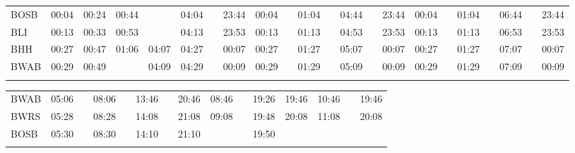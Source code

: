\begin{center}
\begin{tabular}
\begin{tabular}
\begin{tabular}{!{\color{blaulila}\vrule width 3pt}l!{\color{blaulila}\vrule width 3pt}*{3}{*{6}{c|}c!{\color{blaulila}\vrule width 3pt}}}
\hline
{}
 &  &  \\
\hline
BOSB     &
00:04 & 00:24 & 00:44 &       & 04:04 &  & 23:44 &
00:04 &  & 01:04 &          & 04:44 &  & 23:44 &
00:04 &  & 01:04 &          & 06:44 &  & 23:44 \\
BLI      &
00:13 & 00:33 & 00:53 &       & 04:13 & \bli{}   & 23:53 &
00:13 & \bli{}   & 01:13 &  & 04:53 & \bli{}   & 23:53 &
00:13 & \bli{}   & 01:13 &  & 06:53 & \bli{}   & 23:53 \\
BHH      &
00:27 & 00:47 & 01:06 & 04:07 & 04:27 & \bli{}   & 00:07 &
00:27 & \bli{}   & 01:27 & \bli{}   & 05:07 & \bli{}   & 00:07 &
00:27 & \bli{}   & 01:27 & \bli{}   & 07:07 & \bli{}   & 00:07 \\
BWAB     &
00:29 & 00:49 &       & 04:09 & 04:29 & \bli{}   & 00:09 &
00:29 & \bli{}   & 01:29 & \bli{}   & 05:09 & \bli{}   & 00:09 &
00:29 & \bli{}   & 01:29 & \bli{}   & 07:09 & \bli{}   & 00:09 \\
\myhline
\end{tabular}
\fi
\iftapir
\begin{tabular}{!{\color{blaulila}\vrule width 3pt}l!{\color{blaulila}\vrule width 3pt}*{6}{c|}c!{\color{blaulila}\vrule width 3pt}*{3}{c|}c!{\color{blaulila}\vrule width 3pt}*{2}{c|}c!{\color{blaulila}\vrule width 3pt}}
\hline
{}
 &  &  \\
\hline
BWAB     &
05:06 &  & 08:06 &  & 13:46 &  & 20:46 &
08:46 &  & 19:26 & 19:46 &
10:46 &  & 19:46 \\
BWRS     &
05:28 & \bli{}   & 08:28 & \bli{}   & 14:08 & \bli{}   & 21:08 &
09:08 & \bli{}   & 19:48 & 20:08 &
11:08 & \bli{}   & 20:08 \\
BOSB     &
05:30 & \bli{}   & 08:30 &          & 14:10 & \bli{}   & 21:10 &
      &          & 19:50 &       &
      &          &       \\
\myhline
\end{tabular}
\begin{tabular}{!{\color{blaulila}\vrule width 3pt}l!{\color{blaulila}\vrule width 3pt}*{8}{c|}c!{\color{blaulila}\vrule width 3pt}*{4}{c|}c!{\color{blaulila}\vrule width 3pt}*{4}{c|}c!{\color{blaulila}\vrule width 3pt}}

\end{tabular}
\end{tabular}
\end{tabular}
\end{center}
